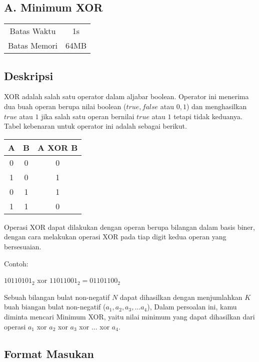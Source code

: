 \documentclass{article}
\begin{document}
\begin{center}
    \section*{A. Minimum XOR} %

    \begin{tabular}{ | c c | }
        \hline
        Batas Waktu  & 1s \\    %
        Batas Memori & 64MB \\  %
        \hline
    \end{tabular}
\end{center}

\subsection*{Deskripsi}

XOR adalah salah satu operator dalam aljabar boolean. Operator ini menerima dua buah operan berupa nilai boolean ($true, false$ atau $0, 1$) dan menghasilkan $true$ atau $1$ jika salah satu operan bernilai $true$ atau $1$ tetapi tidak keduanya. Tabel kebenaran untuk operator ini adalah sebagai berikut.

\begin{center}
\begin{tabular}{c|c|c}
A & B & A XOR B \\ \hline
0 & 0 & 0       \\
1 & 0 & 1       \\
0 & 1 & 1       \\
1 & 1 & 0       
\end{tabular}
\end{center}
Operasi XOR dapat dilakukan dengan operan berupa bilangan dalam basis biner, dengan cara melakukan operasi XOR pada tiap digit kedua operan yang bersesuaian.

Contoh:
\begin{center}
$10110101_2$ xor $11011001_2 = 01101100_2$
\end{center}

Sebuah bilangan bulat non-negatif $N$ dapat dihasilkan dengan menjumlahkan $K$ buah biangan bulat non-negatif ($a_1, a_2, a_3, ... a_4$), Dalam persoalan ini, kamu diminta mencari Minimum XOR, yaitu nilai minimum yang dapat dihasilkan dari operasi  $a_1$ xor $a_2$ xor $a_3$ xor $...$ xor $a_4$.

\subsection*{Format Masukan}
\end{document}
